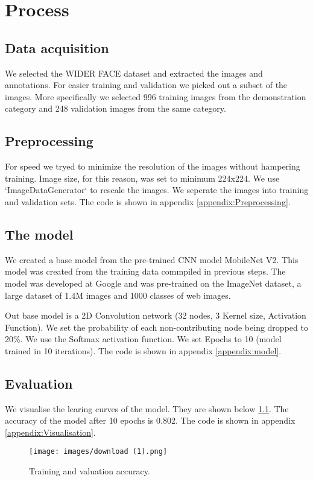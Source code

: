 \documentclass[a4paper, 12pt]{book}
\begin{document}
\chapter{Process}

\section{Data acquisition}
We selected the WIDER FACE dataset and extracted the images and annotations.
For easier training and validation we picked out a subset of the images. More specifically we selected 996 training images from the demonstration category and 248 validation images from the same category.

\section{Preprocessing}
For speed we tryed to minimize the resolution of the images without hampering training. Image size, for this reason, was set to minimum 224x224.
We use `ImageDataGenerator` to rescale the images.
We seperate the images into training and validation sets. The code is shown in appendix \ref{appendix:Preprocessing}.

\section{The model}
We created a base model from the pre-trained CNN model MobileNet V2. This model was created from the training data commpiled in previous steps.
The model was developed at Google and was pre-trained on the ImageNet dataset, a large dataset of 1.4M images and 1000 classes of web images.

Out base model is a 2D Convolution network (32 nodes, 3 Kernel size, Activation Function). We set the probability of each non-contributing node being dropped to 20\%. We use the Softmax activation function. We set Epochs to 10 (model trained in 10 iterations). The code is shown in appendix \ref{appendix:model}.

\section{Evaluation}
We visualise the learing curves of the model. They are shown below \ref{res}. The accuracy of the model after 10 epochs is 0.802. The code is shown in appendix \ref{appendix:Visualisation}.

\begin{figure}[ht]
    \begin{center}
        \texttt{[image: images/download (1).png]}
    \end{center}
    \caption{Training and valuation accuracy.}
    \label{res}
\end{figure}
\end{document}
